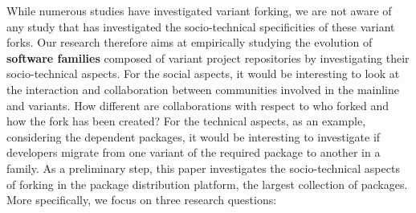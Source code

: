 While numerous studies have investigated variant forking, we are not aware of any study that has investigated the socio-technical specificities of these variant forks.
Our research therefore aims at empirically studying the evolution of \textbf{software families} composed of variant project repositories by investigating their socio-technical aspects.
For the social aspects, it would be interesting to look at the interaction and collaboration between communities involved in the mainline and variants.
How different are collaborations with respect to who forked and how the fork has been created?
For the technical aspects, as an example, considering the dependent packages, it would be interesting to investigate if developers migrate from one variant of the required package to another in a family.
As a preliminary step, this paper investigates the socio-technical aspects of forking in the \np package distribution platform, the largest collection of \js packages.
 More specifically, we focus on three research questions:

